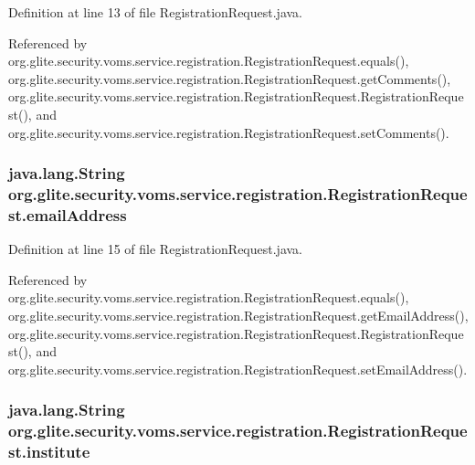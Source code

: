 Definition at line 13 of file RegistrationRequest.java.



Referenced by org.glite.security.voms.service.registration.RegistrationRequest.equals(), org.glite.security.voms.service.registration.RegistrationRequest.getComments(), org.glite.security.voms.service.registration.RegistrationRequest.RegistrationRequest(), and org.glite.security.voms.service.registration.RegistrationRequest.setComments().

\hypertarget{classorg_1_1glite_1_1security_1_1voms_1_1service_1_1registration_1_1RegistrationRequest_a365a6cdc781170ea227509e1cc204f3c}{
\subsubsection[{emailAddress}]{\setlength{\rightskip}{0pt plus 5cm}java.lang.String {\bf org.glite.security.voms.service.registration.RegistrationRequest.emailAddress}}}
\label{classorg_1_1glite_1_1security_1_1voms_1_1service_1_1registration_1_1RegistrationRequest_a365a6cdc781170ea227509e1cc204f3c}


Definition at line 15 of file RegistrationRequest.java.



Referenced by org.glite.security.voms.service.registration.RegistrationRequest.equals(), org.glite.security.voms.service.registration.RegistrationRequest.getEmailAddress(), org.glite.security.voms.service.registration.RegistrationRequest.RegistrationRequest(), and org.glite.security.voms.service.registration.RegistrationRequest.setEmailAddress().

\hypertarget{classorg_1_1glite_1_1security_1_1voms_1_1service_1_1registration_1_1RegistrationRequest_a67d3f7cb40f1659a7181aca6cefbdcb9}{
\subsubsection[{institute}]{\setlength{\rightskip}{0pt plus 5cm}java.lang.String {\bf org.glite.security.voms.service.registration.RegistrationRequest.institute}}}
\label{classorg_1_1glite_1_1security_1_1voms_1_1service_1_1registration_1_1RegistrationRequest_a67d3f7cb40f1659a7181aca6cefbdcb9}



